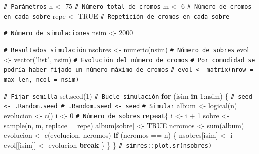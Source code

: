 \documentclass[
]{book}
\newenvironment{Shaded}{\begin{snugshade}}{\end{snugshade}}
\newcommand{\AttributeTok}[1]{\textcolor[rgb]{0.77,0.63,0.00}{#1}}
\newcommand{\CommentTok}[1]{\textcolor[rgb]{0.56,0.35,0.01}{\textit{#1}}}
\newcommand{\ConstantTok}[1]{\textcolor[rgb]{0.00,0.00,0.00}{#1}}
\newcommand{\ControlFlowTok}[1]{\textcolor[rgb]{0.13,0.29,0.53}{\textbf{#1}}}
\newcommand{\DecValTok}[1]{\textcolor[rgb]{0.00,0.00,0.81}{#1}}
\newcommand{\FunctionTok}[1]{\textcolor[rgb]{0.00,0.00,0.00}{#1}}
\newcommand{\NormalTok}[1]{#1}
\newcommand{\OtherTok}[1]{\textcolor[rgb]{0.56,0.35,0.01}{#1}}
\newcommand{\SpecialCharTok}[1]{\textcolor[rgb]{0.00,0.00,0.00}{#1}}
\newcommand{\StringTok}[1]{\textcolor[rgb]{0.31,0.60,0.02}{#1}}
\theoremstyle{break}
\theoremstyle{nonumberplain}
\renewcommand{\CommentTok}[1]{\textcolor[rgb]{0.41,0.41,0.41}{\texttt{#1}}}
\begin{document}
\begin{Shaded}
\begin{Highlighting}[]
\CommentTok{\# Parámetros}
\NormalTok{n }\OtherTok{\textless{}{-}} \DecValTok{75} \CommentTok{\# Número total de cromos}
\NormalTok{m }\OtherTok{\textless{}{-}} \DecValTok{6}  \CommentTok{\# Número de cromos en cada sobre}
\NormalTok{repe }\OtherTok{\textless{}{-}} \ConstantTok{TRUE} \CommentTok{\# Repetición de cromos en cada sobre}

\CommentTok{\# Número de simulaciones}
\NormalTok{nsim }\OtherTok{\textless{}{-}} \DecValTok{2000}

\CommentTok{\# Resultados simulación}
\NormalTok{nsobres }\OtherTok{\textless{}{-}} \FunctionTok{numeric}\NormalTok{(nsim)      }\CommentTok{\# Número de sobres}
\NormalTok{evol }\OtherTok{\textless{}{-}} \FunctionTok{vector}\NormalTok{(}\StringTok{"list"}\NormalTok{, nsim)  }\CommentTok{\# Evolución del número de cromos}
\CommentTok{\# Por comodidad se podría haber fijado un número máximo de cromos}
\CommentTok{\# evol \textless{}{-} matrix(nrow = max\_len, ncol = nsim)}

\CommentTok{\# Fijar semilla}
\FunctionTok{set.seed}\NormalTok{(}\DecValTok{1}\NormalTok{)}
\CommentTok{\# Bucle simulación}
\ControlFlowTok{for}\NormalTok{ (isim }\ControlFlowTok{in} \DecValTok{1}\SpecialCharTok{:}\NormalTok{nsim) \{}
  \CommentTok{\# seed \textless{}{-} .Random.seed \# .Random.seed \textless{}{-} seed}
  \CommentTok{\# Simular}
\NormalTok{  album }\OtherTok{\textless{}{-}} \FunctionTok{logical}\NormalTok{(n)}
\NormalTok{  evolucion }\OtherTok{\textless{}{-}} \FunctionTok{c}\NormalTok{()}
\NormalTok{  i }\OtherTok{\textless{}{-}} \DecValTok{0} \CommentTok{\# Número de sobres}
  \ControlFlowTok{repeat}\NormalTok{\{}
\NormalTok{    i }\OtherTok{\textless{}{-}}\NormalTok{ i }\SpecialCharTok{+} \DecValTok{1}
\NormalTok{    sobre }\OtherTok{\textless{}{-}} \FunctionTok{sample}\NormalTok{(n, m, }\AttributeTok{replace =}\NormalTok{ repe)}
\NormalTok{    album[sobre] }\OtherTok{\textless{}{-}} \ConstantTok{TRUE}
\NormalTok{    ncromos }\OtherTok{\textless{}{-}} \FunctionTok{sum}\NormalTok{(album)}
\NormalTok{    evolucion }\OtherTok{\textless{}{-}} \FunctionTok{c}\NormalTok{(evolucion, ncromos)}
    \ControlFlowTok{if}\NormalTok{ (ncromos }\SpecialCharTok{==}\NormalTok{ n) \{}
\NormalTok{      nsobres[isim] }\OtherTok{\textless{}{-}}\NormalTok{ i}
\NormalTok{      evol[[isim]] }\OtherTok{\textless{}{-}}\NormalTok{ evolucion}
      \ControlFlowTok{break}
\NormalTok{    \}}
\NormalTok{  \}}
\NormalTok{\}}
\CommentTok{\# simres::plot.sr(nsobres)}
\end{Highlighting}
\end{Shaded}
\end{document}
